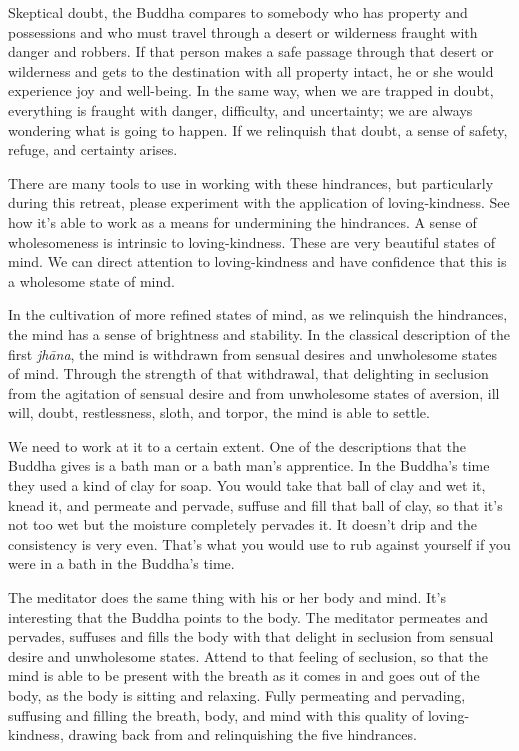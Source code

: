 Skeptical doubt, the Buddha compares to somebody who has property and
possessions and who must travel through a desert or wilderness fraught
with danger and robbers. If that person makes a safe passage through
that desert or wilderness and gets to the destination with all property
intact, he or she would experience joy and well-being. In the same way,
when we are trapped in doubt, everything is fraught with danger,
difficulty, and uncertainty; we are always wondering what is going to
happen. If we relinquish that doubt, a sense of safety, refuge, and
certainty arises.

There are many tools to use in working with these hindrances, but
particularly during this retreat, please experiment with the application
of loving-kindness. See how it’s able to work as a means for undermining
the hindrances. A sense of wholesomeness is intrinsic to
loving-kindness. These are very beautiful states of mind. We can direct
attention to loving-kindness and have confidence that this is a
wholesome state of mind.

In the cultivation of more refined states of mind, as we relinquish the
hindrances, the mind has a sense of brightness and stability. In the
classical description of the first \emph{jhāna}, the mind is withdrawn
from sensual desires and unwholesome states of mind. Through the
strength of that withdrawal, that delighting in seclusion from the
agitation of sensual desire and from unwholesome states of aversion, ill
will, doubt, restlessness, sloth, and torpor, the mind is able to
settle.

We need to work at it to a certain extent. One of the descriptions that
the Buddha gives is a bath man or a bath man’s apprentice. In the
Buddha’s time they used a kind of clay for soap. You would take that
ball of clay and wet it, knead it, and permeate and pervade, suffuse and
fill that ball of clay, so that it’s not too wet but the moisture
completely pervades it. It doesn’t drip and the consistency is very
even. That’s what you would use to rub against yourself if you were in a
bath in the Buddha’s time.

The meditator does the same thing with his or her body and mind. It’s
interesting that the Buddha points to the body. The meditator permeates
and pervades, suffuses and fills the body with that delight in seclusion
from sensual desire and unwholesome states. Attend to that feeling of
seclusion, so that the mind is able to be present with the breath as it
comes in and goes out of the body, as the body is sitting and relaxing.
Fully permeating and pervading, suffusing and filling the breath, body,
and mind with this quality of loving-kindness, drawing back from and
relinquishing the five hindrances.

